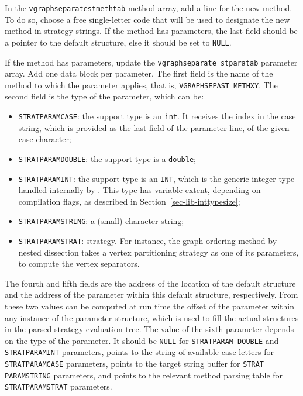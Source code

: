 \begin{enumerate}
In the {\tt vgraph\lbt separate\lbt st\lbt meth\lbt tab} method array,
add a line for the new method. To do so, choose a free single-letter
code that will be used to designate the new method in strategy strings.
If the method has parameters, the last field should be a pointer to
the default structure, else it should be set to {\tt NULL}.

If the method has parameters, update the {\tt vgraph\lbt separate\lbt
st\lbt para\lbt tab} parameter array. Add one data block per
parameter. The first field is the name of the method to which the
parameter applies, that is, {\tt VGRAPH\lbt SEPA\lbt ST\lbt
METH\lbt XY}. The second field is the type of the parameter, which can
be:
\begin{itemize}
\item
{\tt STRATPARAMCASE}: the support type is an {\tt int}. It receives
the index in the case string, which is provided as the last field of
the parameter line, of the given case character;
\item
{\tt STRATPARAMDOUBLE}: the support type is a {\tt double};
\item
{\tt STRATPARAMINT}: the support type is an {\tt INT}, which
is the generic integer type handled internally by \scotch. This type
has variable extent, depending on compilation flags,
as described in Section~\ref{sec-lib-inttypesize};
\item
{\tt STRATPARAMSTRING}: a (small) character string;
\item
{\tt STRATPARAMSTRAT}: strategy. For instance, the graph ordering
method by nested dissection takes a vertex partitioning strategy as
one of its parameters, to compute the vertex separators.
\end{itemize}
The fourth and fifth fields are the address of the location of the
default structure and the address of the parameter within this default
structure, respectively. From these two values can be computed at run
time the offset of the parameter within any instance of the parameter
structure, which is used to fill the actual structures in the parsed
strategy evaluation tree.
The value of the sixth parameter depends on the type of the
parameter. It should be {\tt NULL} for {\tt STRAT\lbt PARAM\lbt
DOUBLE} and {\tt STRAT\lbt PARAM\lbt INT} parameters, points to the
string of available case letters for {\tt STRAT\lbt PARAM\lbt CASE}
parameters, points to the target string buffer for {\tt STRAT\lbt
PARAM\lbt STRING} parameters, and points to the relevant method
parsing table for {\tt STRAT\lbt PARAM\lbt STRAT} parameters.

\end{enumerate}
